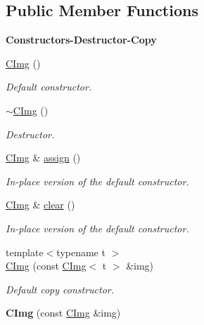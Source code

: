 \subsection*{Public Member Functions}
\begin{Indent}{\bf Constructors-\/\-Destructor-\/\-Copy}\par
\begin{DoxyCompactItemize}
\item 
\hyperlink{structcimg__library_1_1_c_img_a76918ef9658da71040f29084bfe45de7}{C\-Img} ()
\begin{DoxyCompactList}\small\item\em Default constructor. \end{DoxyCompactList}\item 
\hyperlink{structcimg__library_1_1_c_img_a563f74a7b1f7f5313d1f1b86bfb23efd}{$\sim$\-C\-Img} ()
\begin{DoxyCompactList}\small\item\em Destructor. \end{DoxyCompactList}\item 
\hyperlink{structcimg__library_1_1_c_img}{C\-Img} \& \hyperlink{structcimg__library_1_1_c_img_a34e498eaf7ce5d83df329953e54f4292}{assign} ()
\begin{DoxyCompactList}\small\item\em In-\/place version of the default constructor. \end{DoxyCompactList}\item 
\hyperlink{structcimg__library_1_1_c_img}{C\-Img} \& \hyperlink{structcimg__library_1_1_c_img_a03f62716b3aeefb924ec762fbac6d959}{clear} ()
\begin{DoxyCompactList}\small\item\em In-\/place version of the default constructor. \end{DoxyCompactList}\item 
{\footnotesize template$<$typename t $>$ }\\\hyperlink{structcimg__library_1_1_c_img_a77871bed283c449b2e9ed5624811c68e}{C\-Img} (const \hyperlink{structcimg__library_1_1_c_img}{C\-Img}$<$ t $>$ \&img)
\begin{DoxyCompactList}\small\item\em Default copy constructor. \end{DoxyCompactList}\item 
\hypertarget{structcimg__library_1_1_c_img_aacebe08bfd98028adc04ce1a997177f5}{{\bfseries C\-Img} (const \hyperlink{structcimg__library_1_1_c_img}{C\-Img} \&img)}\label{structcimg__library_1_1_c_img_aacebe08bfd98028adc04ce1a997177f5}


\end{DoxyCompactItemize}
\end{Indent}
